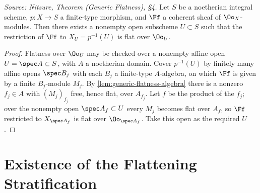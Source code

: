 \begin{theorem}
  \label{thm:generic-flatness}
  \textit{Source: Nitsure, Theorem (Generic Flatness), §4.}
  Let \(S\) be a noetherian integral scheme, \(p:X\to S\) a finite-type morphism,
  and \(\Ff\) a coherent sheaf of \(\Oo_X\)-modules. Then there exists a nonempty
  open subscheme \(U\subset S\) such that the restriction of \(\Ff\) to
  \(X_U = p^{-1}(U)\) is flat over \(\Oo_U\).
\end{theorem}

\begin{proof}
  Flatness over \(\Oo_U\) may be checked over a nonempty affine open
  \(U=\spec A\subset S\), with \(A\) a noetherian domain. Cover \(p^{-1}(U)\) by
  finitely many affine opens \(\spec B_j\) with each \(B_j\) a finite-type
  \(A\)-algebra, on which \(\Ff\) is given by a finite \(B_j\)-module \(M_j\). By
  \cref{lem:generic-flatness-algebra} there is a nonzero \(f_j\in A\) with
  \((M_j)_{f_j}\) free, hence flat, over \(A_{f_j}\). Let \(f\) be the product of
  the \(f_j\); over the nonempty open \(\spec A_f\subset U\) every \(M_j\) becomes
  flat over \(A_f\), so \(\Ff\) restricted to \(X_{\spec A_f}\) is flat over
  \(\Oo_{\spec A_f}\). Take this open as the required \(U\).
\end{proof}

\bigskip
\section*{Existence of the Flattening Stratification}
\medskip

